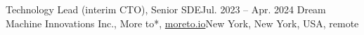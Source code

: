 \resumeSubheading
{Technology Lead (interim CTO), Senior SDE}{Jul. 2023 -- Apr. 2024}
{Dream Machine Innovations Inc., More to*, \href{https://moreto.io}{moreto.io}}{New York, New York, USA, remote}
\resumeItemListStart
\resumeItemListEnd